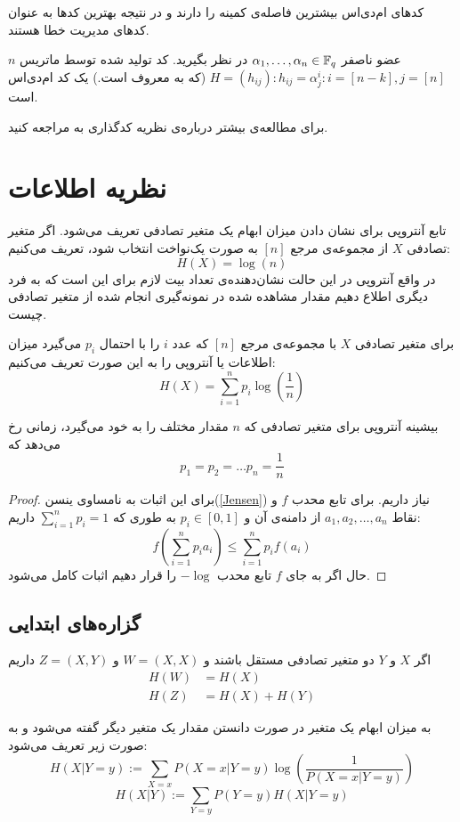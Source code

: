کدهای ام‌دی‌اس بیشترین فاصله‌ی کمینه را دارند و در نتیجه بهترین کدها به عنوان کدهای مدیریت خطا هستند.
\begin{example}
	$n$
	عضو ناصفر
	$\alpha_1, \ldots, \alpha_n \in \mathbb{F}_q$
	در نظر بگیرید. کد تولید شده توسط ماتریس 
	$H = (h_{ij}): h_{ij} = \alpha_j^i: i = [n - k], j = [n]$
	(که به
	 معروف است.) یک کد ام‌دی‌اس است.
\end{example}

	برای مطالعه‌ی بیشتر درباره‌ی نظریه کدگذاری به
\cite{book:coding}
مراجعه کنید.
\section{نظریه اطلاعات}
تابع آنتروپی برای نشان دادن میزان ابهام یک متغیر تصادفی تعریف می‌شود. اگر متغیر تصادفی
$X$
از مجموعه‌ی مرجع
$[n]$
به صورت یک‌نواخت انتخاب شود، تعریف می‌کنیم:
$$H(X) = \log(n)$$
در واقع آنتروپی در این حالت نشان‌دهنده‌ی تعداد بیت لازم برای این است که به فرد دیگری اطلاع دهیم مقدار مشاهده شده در نمونه‌گیری انجام شده از متغیر تصادفی چیست. 


\begin{definition}[آنتروپی]
برای متغیر تصادفی
$X$
با مجموعه‌ی مرجع
$[n]$
که عدد
$i$
را با احتمال
$p_i$
می‌گیرد میزان اطلاعات یا آنتروپی را به این صورت تعریف می‌کنیم:
$$H(X) = \sum_{i = 1}^{n} p_i \log(\frac{1}{n})$$
\end{definition}
\begin{theorem}
بیشینه آنتروپی برای متغیر تصادفی که
$n$
مقدار مختلف را به خود می‌گیرد، زمانی رخ می‌دهد که
$$p_1 = p_2 = \dots p_n = \frac{1}{n}$$
\end{theorem}
\begin{proof}
برای این اثبات به نامساوی ینسن(\autoref{Jensen})
 نیاز داریم. برای تابع محدب
$f$
و نقاط
$a_1, a_2, \dots, a_n$
از دامنه‌ی آن و
$p_i \in [0, 1]$
به طوری که
$\sum_{i = 1}^{n} p_i = 1$
داریم:
$$f(\sum_{i = 1}^{n} p_i a_i) \leq \sum_{i = 1}^{n} p_i f(a_i)$$
حال اگر به جای
$f$
تابع محدب
$-\log$
را قرار دهیم اثبات کامل می‌شود.
\end{proof}

\subsection{گزاره‌های ابتدایی}
\begin{theorem}
اگر
$X$
و
$Y$
دو متغیر تصادفی مستقل باشند و
$W = (X, X)$
و
$Z = (X, Y)$
داریم
\begin{align*}
    H(W) &= H(X) \\
    H(Z) &= H(X) + H(Y)
\end{align*}
\end{theorem}
\begin{definition}
	به میزان ابهام یک متغیر در صورت دانستن مقدار یک متغیر دیگر گفته می‌شود و به صورت زیر تعریف می‌شود:
$$H(X | Y = y) := \sum_{X = x} P(X = x| Y = y) \log(\frac{1}{P(X = x| Y = y)})$$
$$H(X|Y) := \sum_{Y = y} P(Y = y) H(X | Y = y)$$
\end{definition}

